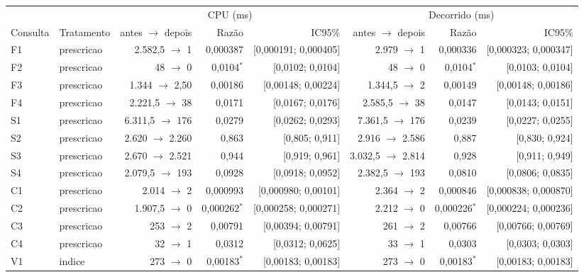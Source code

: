 {\footnotesize\setlength{\tabcolsep}{4pt}
\begin{tabular}{llrrrrrr}
\toprule
 &  & \multicolumn{3}{c}{CPU (ms)} & \multicolumn{3}{c}{Decorrido (ms)} \\
\cmidrule(lr){3-5}\cmidrule(lr){6-8}
Consulta & Tratamento & antes $\to$ depois & Razão & IC95\% & antes $\to$ depois & Razão & IC95\% \\
\midrule
F1 & prescricao & 2.582,5 $\to$ 1 & 0,000387 & [0,000191; 0,000405] & 2.979 $\to$ 1 & 0,000336 & [0,000323; 0,000347] \\
F2 & prescricao & 48 $\to$ 0 & 0,0104$^{*}$ & [0,0102; 0,0104] & 48 $\to$ 0 & 0,0104$^{*}$ & [0,0103; 0,0104] \\
F3 & prescricao & 1.344 $\to$ 2,50 & 0,00186 & [0,00148; 0,00224] & 1.344,5 $\to$ 2 & 0,00149 & [0,00148; 0,00186] \\
F4 & prescricao & 2.221,5 $\to$ 38 & 0,0171 & [0,0167; 0,0176] & 2.585,5 $\to$ 38 & 0,0147 & [0,0143; 0,0151] \\
S1 & prescricao & 6.311,5 $\to$ 176 & 0,0279 & [0,0262; 0,0293] & 7.361,5 $\to$ 176 & 0,0239 & [0,0227; 0,0255] \\
S2 & prescricao & 2.620 $\to$ 2.260 & 0,863 & [0,805; 0,911] & 2.916 $\to$ 2.586 & 0,887 & [0,830; 0,924] \\
S3 & prescricao & 2.670 $\to$ 2.521 & 0,944 & [0,919; 0,961] & 3.032,5 $\to$ 2.814 & 0,928 & [0,911; 0,949] \\
S4 & prescricao & 2.079,5 $\to$ 193 & 0,0928 & [0,0918; 0,0952] & 2.382,5 $\to$ 193 & 0,0810 & [0,0806; 0,0835] \\
C1 & prescricao & 2.014 $\to$ 2 & 0,000993 & [0,000980; 0,00101] & 2.364 $\to$ 2 & 0,000846 & [0,000838; 0,000870] \\
C2 & prescricao & 1.907,5 $\to$ 0 & 0,000262$^{*}$ & [0,000258; 0,000271] & 2.212 $\to$ 0 & 0,000226$^{*}$ & [0,000224; 0,000236] \\
C3 & prescricao & 253 $\to$ 2 & 0,00791 & [0,00394; 0,00791] & 261 $\to$ 2 & 0,00766 & [0,00766; 0,00769] \\
C4 & prescricao & 32 $\to$ 1 & 0,0312 & [0,0312; 0,0625] & 33 $\to$ 1 & 0,0303 & [0,0303; 0,0303] \\
V1 & indice & 273 $\to$ 0 & 0,00183$^{*}$ & [0,00183; 0,00183] & 273 $\to$ 0 & 0,00183$^{*}$ & [0,00183; 0,00183] \\

\end{tabular}}
